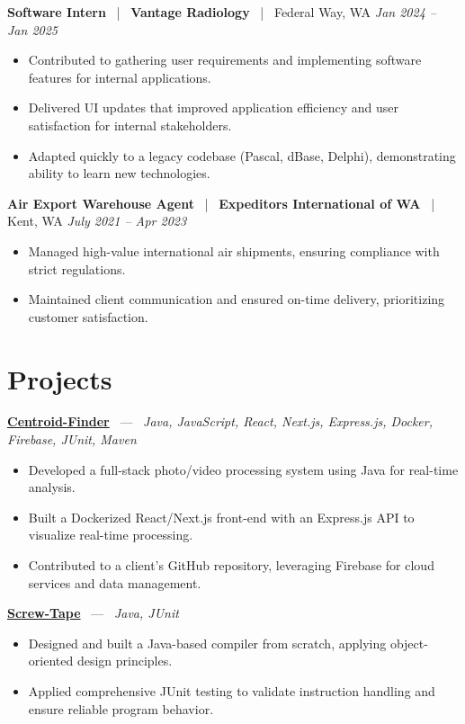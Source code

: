\documentclass[10pt, letterpaper]{article}
\newcommand{\jobhead}[4]{%
  \vspace{5pt}%
  {\bfseries\color{dark}#1}%
  ~{\color{light}|}~%
  {\bfseries\color{navy}#2}%
  ~{\color{light}|}~%
  {\color{light}#3}%
  \hfill{\color{light}\small\textit{#4}}\\[-2pt]%
}
\newcommand{\projhead}[3]{%
  \vspace{5pt}%
  {\bfseries\color{dark}\href{#2}{#1}}%
  ~{\color{light}---}~%
  {\color{light}\small\textit{#3}}\\[-2pt]%
}
\begin{document}
\jobhead{Software Intern}{Vantage Radiology}{Federal Way, WA}{Jan 2024 – Jan 2025}
\begin{itemize}
  \item Contributed to gathering user requirements and implementing software features for internal applications.
  \item Delivered UI updates that improved application efficiency and user satisfaction for internal stakeholders.
  \item Adapted quickly to a legacy codebase (Pascal, dBase, Delphi), demonstrating ability to learn new technologies.
\end{itemize}

\jobhead{Air Export Warehouse Agent}{Expeditors International of WA}{Kent, WA}{July 2021 – Apr 2023}
\begin{itemize}
  \item Managed high-value international air shipments, ensuring compliance with strict regulations.
  \item Maintained client communication and ensured on-time delivery, prioritizing customer satisfaction.
\end{itemize}

\section{Projects}

\projhead{Centroid-Finder}{https://github.com/xavierb117/centroid-finder}{Java, JavaScript, React, Next.js, Express.js, Docker, Firebase, JUnit, Maven}
\begin{itemize}
  \item Developed a full-stack photo/video processing system using Java for real-time analysis.
  \item Built a Dockerized React/Next.js front-end with an Express.js API to visualize real-time processing.
  \item Contributed to a client's GitHub repository, leveraging Firebase for cloud services and data management.
\end{itemize}

\projhead{Screw-Tape}{https://github.com/timmyd4/screwtape}{Java, JUnit}
\begin{itemize}
  \item Designed and built a Java-based compiler from scratch, applying object-oriented design principles.
  \item Applied comprehensive JUnit testing to validate instruction handling and ensure reliable program behavior.
\end{itemize}
\end{document}
